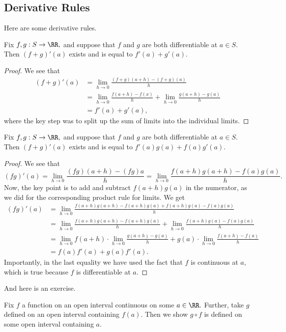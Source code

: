 \documentclass[../notes.tex]{subfiles}
\begin{document}
\subsection{Derivative Rules}
Here are some derivative rules.
\begin{proposition}
	Fix $f,g:S\to\RR,$ and suppose that $f$ and $g$ are both differentiable at $a\in S.$ Then $(f+g)'(a)$ exists and is equal to $f'(a)+g'(a).$
\end{proposition}
\begin{proof}
	We see that
	\begin{align*}
		(f+g)'(a) &= \lim_{h\to0}\frac{(f+g)(a+h)-(f+g)(a)}h \\
		&= \lim_{h\to0}\frac{f(a+h)-f(x)}h+\lim_{h\to0}\frac{g(a+h)-g(a)}h \\
		&= f'(a)+g'(a),
	\end{align*}
	where the key step was to split up the sum of limits into the individual limits.
\end{proof}
\begin{proposition}
	Fix $f,g:S\to\RR,$ and suppose that $f$ and $g$ are both differentiable at $a\in S.$ Then $(f+g)'(a)$ exists and is equal to $f'(a)g(a)+f(a)g'(a).$
\end{proposition}
\begin{proof}
	We see that
	\[(fg)'(a)=\lim_{h\to0}\frac{(fg)(a+h)-(fg)a}h=\lim_{h\to0}\frac{f(a+h)g(a+h)-f(a)g(a)}h.\]
	Now, the key point is to add and subtract $f(a+h)g(a)$ in the numerator, as we did for the corresponding product rule for limits. We get
	\begin{align*}
		(fg)'(a) &= \lim_{h\to0}\frac{f(a+h)g(a+h)-f(a+h)g(a)+f(a+h)g(a)-f(a)g(a)}h \\
		&= \lim_{h\to0}\frac{f(a+h)g(a+h)-f(a+h)g(a)}h+\lim_{h\to0}\frac{f(a+h)g(a)-f(a)g(a)}h \\
		&= \lim_{h\to0}f(a+h)\cdot\lim_{h\to0}\frac{g(a+h)-g(a)}h+g(a)\cdot\lim_{h\to0}\frac{f(a+h)-f(a)}h \\
		&= f(a)f'(a)+g(a)f'(a).
	\end{align*}
	Importantly, in the last equality we have used the fact that $f$ is continuous at $a,$ which is true because $f$ is differentiable at $a.$
\end{proof}
And here is an exercise.
\begin{exe}
	Fix $f$ a function on an open interval continuous on some $a\in\RR.$ Further, take $g$ defined on an open interval containing $f(a).$ Then we show $g\circ f$ is defined on some open interval containing $a.$
\end{exe}
\end{document}
